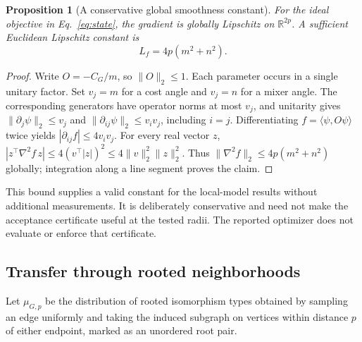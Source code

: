 \documentclass[11pt]{article}
\newtheorem{proposition}[theorem]{Proposition}
\begin{document}
\begin{proposition}[A conservative global smoothness constant]
\label{prop:smoothness}
For the ideal objective in Eq.~\eqref{eq:state}, the gradient is globally
Lipschitz on $\mathbb R^{2p}$. A sufficient Euclidean Lipschitz constant is
\begin{equation}
 L_f=4p(m^2+n^2).
 \label{eq:globalsmoothness}
\end{equation}
\end{proposition}
\begin{proof}
Write $O=-C_G/m$, so $\|O\|_2\le1$. Each parameter occurs in a single
unitary factor. Set $v_j=m$ for a cost angle and $v_j=n$ for a mixer angle.
The corresponding generators have operator norms at most $v_j$, and
unitarity gives $\|\partial_j\psi\|_2\le v_j$ and
$\|\partial_{ij}\psi\|_2\le v_i v_j$, including $i=j$.
Differentiating $f=\langle\psi,O\psi\rangle$ twice yields
$|\partial_{ij}f|\le4v_i v_j$. For every real vector $z$,
$|z^\top\nabla^2f\,z|\le4(v^\top|z|)^2
\le4\|v\|_2^2\|z\|_2^2$.
Thus $\|\nabla^2f\|_2\le4p(m^2+n^2)$ globally; integration along
a line segment proves the claim.
\end{proof}
This bound supplies a valid constant for the local-model results without
additional measurements. It is deliberately conservative and need not
make the acceptance certificate useful at the tested radii. The reported
optimizer does not evaluate or enforce that certificate.

\subsection{Transfer through rooted neighborhoods}
Let $\mu_{G,p}$ be the distribution of rooted isomorphism types obtained
by sampling an edge uniformly and taking the induced subgraph on vertices
within distance $p$ of either endpoint, marked as an unordered root pair.
\end{document}
